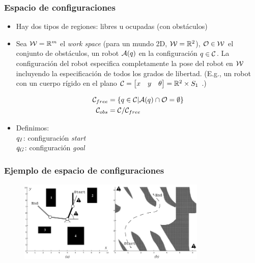 \begin{frame}
	\frametitle{Espacio de configuraciones}
	\begin{itemize}
		\item Hay dos tipos de regiones: libres u ocupadas (con obstáculos)
		\item Sea $\mathcal{W} = \mathbb{R}^{m}$ el \emph{work space} (para un mundo 2D, $\mathcal{W} = \mathbb{R}^{2}$), $\mathcal{O} \in \mathcal{W}$ el conjunto de obstáculos, un robot $\mathcal{A}(q)$ en la configuración $q \in \mathcal{C}$.
        La configuración del robot especifica completamente la pose del robot en $\mathcal{W}$ incluyendo la especificación de todos los grados de libertad. (E.g., un robot con un cuerpo rígido en el plano $\mathcal{C} = \begin{bmatrix}
            x & y & \theta
        \end{bmatrix} = \mathbb{R}^{2} \times S_{1}$ .)
        
		\begin{align*}
			 \mathcal{C}_{free} &= \left\lbrace q \in \mathcal{C} | \mathcal{A}(q) \cap \mathcal{O} =  \emptyset \right\rbrace\\
			 \mathcal{C}_{obs} &= \mathcal{C} / \mathcal{C}_{free}
		\end{align*}
	
		\item Definimos:\\
		$q_{I}$: configuración \emph{start}\\
		$q_{G}$: configuración \emph{goal}
	\end{itemize}
	
\end{frame}

\begin{frame}
	\frametitle{Ejemplo de espacio de configuraciones}
	
	\begin{figure}[!h]
		\includegraphics[width=0.8\textwidth]{images/configuration_space_manipulator.pdf}
	\end{figure}
	
\end{frame}

